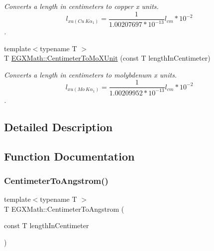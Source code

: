 \begin{DoxyCompactItemize}
\begin{DoxyCompactList}\small\item\em Converts a length in centimeters to copper x units. \[ l_{xu(Cu\ K\alpha_1)}= \frac{1}{1.00207697*10^{-13}} l_{cm} * 10^{-2}\]. \end{DoxyCompactList}\item 
{\footnotesize template$<$typename T $>$ }\\T \mbox{\hyperlink{group___e_g_x_math-_conversions-_length_conversions-_s_i-_centimeter-_non-_s_i_ga4e94aa6f1cc6aaeb751384a8472b01fd}{E\+G\+X\+Math\+::\+Centimeter\+To\+Mo\+X\+Unit}} (const T length\+In\+Centimeter)
\begin{DoxyCompactList}\small\item\em Converts a length in centimeters to molybdenum x units. \[ l_{xu(Mo\ K\alpha_1)}=\frac{1}{1.00209952*10^{-13}} l_{cm} * 10^{-2}\]. \end{DoxyCompactList}\end{DoxyCompactItemize}


\subsection{Detailed Description}


\subsection{Function Documentation}
\mbox{\label{group___e_g_x_math-_conversions-_length_conversions-_s_i-_centimeter-_non-_s_i_gacabf2b01cd8676ffb5ec8c70ecd621b6}} 
\subsubsection{\texorpdfstring{Centimeter\+To\+Angstrom()}{CentimeterToAngstrom()}}
{\footnotesize\ttfamily template$<$typename T $>$ \\
T E\+G\+X\+Math\+::\+Centimeter\+To\+Angstrom (\begin{DoxyParamCaption}\item[{const T}]{length\+In\+Centimeter }\end{DoxyParamCaption})}



